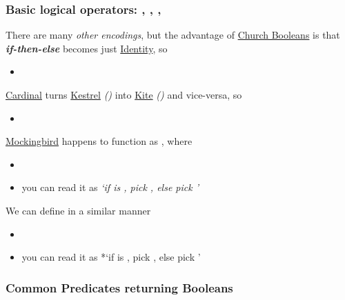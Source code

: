 \subsubsection*{\texorpdfstring{Basic logical operators:
, , ,
}{Basic logical operators: , , , }}

There are many \textit{other encodings}, but the advantage of \ul{Church
Booleans} is that \textbf{\textit{if-then-else}} becomes just
\ul{Identity}, so

\begin{itemize}
\tightlist
\item
\end{itemize}

\ul{Cardinal} turns \ul{Kestrel} \textit{()} into
\ul{Kite} \textit{()} and vice-versa, so

\begin{itemize}
\tightlist
\item
\end{itemize}

\ul{Mockingbird} happens to function as , where

\begin{itemize}
\tightlist
\item
\item
  you can read it as \textit{`if  is ,
  pick , else pick '}
\end{itemize}

We can define  in a similar manner

\begin{itemize}
\tightlist
\item
\item
  you can read it as *`if  is , pick
  , else pick '
\end{itemize}

\subsubsection*{Common Predicates returning Booleans}

